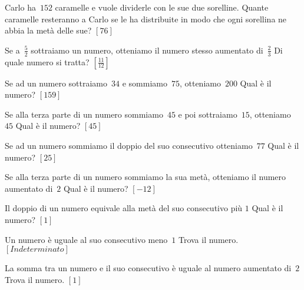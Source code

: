 \begin{multicols}{2}
\begin{esercizio}[\Ast]
\label{ese:14.9}
Carlo ha~$152$ caramelle e vuole dividerle con le sue due sorelline. Quante 
caramelle resteranno a Carlo se le ha distribuite in modo che ogni sorellina ne 
abbia la metà delle sue? \hfill $\left[76\right]$
\end{esercizio}

\begin{esercizio}[\Ast]
\label{ese:14.10}
Se a~$\frac{5}{2}$ sottraiamo un numero, otteniamo il numero stesso aumentato 
di~$\frac{2}{3}$ Di quale numero si tratta? \hfill $\left[\frac{11}{12}\right]$
\end{esercizio}

\begin{esercizio}[\Ast]
\label{ese:14.11}
Se ad un numero sottraiamo~$34$ e sommiamo~$75$, otteniamo~$200$ Qual è il 
numero? \hfill $\left[159\right]$
\end{esercizio}

\begin{esercizio}[\Ast]
\label{ese:14.12}
Se alla terza parte di un numero sommiamo~$45$ e poi sottraiamo~$15$, 
otteniamo~$45$ Qual è il numero? \hfill $\left[45\right]$
\end{esercizio}

\begin{esercizio}[\Ast]
\label{ese:14.13}
Se ad un numero sommiamo il doppio del suo consecutivo otteniamo~$77$ Qual è il 
numero? \hfill $\left[25\right]$
\end{esercizio}

\begin{esercizio}[\Ast]
\label{ese:14.14}
Se alla terza parte di un numero sommiamo la sua metà, otteniamo il numero 
aumentato di~$2$ Qual è il numero? \hfill $\left[-12\right]$
\end{esercizio}

\begin{esercizio}[\Ast]
\label{ese:14.15}
Il doppio di un numero equivale alla metà del suo consecutivo più $1$ Qual è il 
numero? \hfill $\left[1\right]$
\end{esercizio}

\begin{esercizio}[\Ast]
\label{ese:14.16}
Un numero è uguale al suo consecutivo meno~$1$ Trova il numero. 
\hfill $\left[Indeterminato\right]$
\end{esercizio}

\begin{esercizio}[\Ast]
\label{ese:14.17}
La somma tra un numero e il suo consecutivo è uguale al numero aumentato di~$2$ 
Trova il numero. \hfill $\left[1\right]$
\end{esercizio}


\end{multicols}
